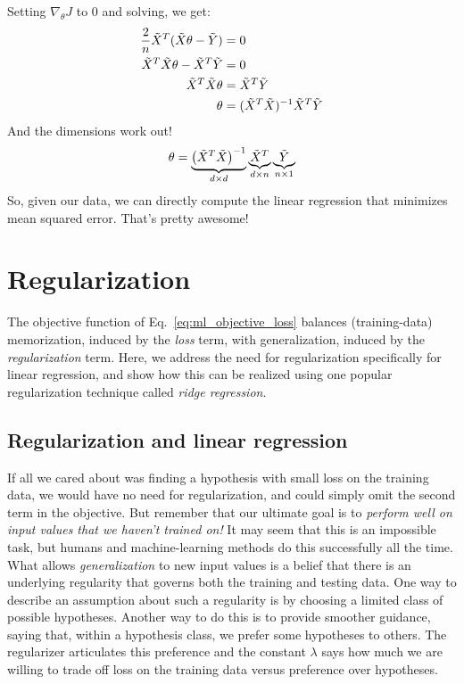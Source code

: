 Setting $ \nabla_{\theta}J$ to 0 and solving, we get:
\begin{align*}
  \frac{2}{n}\tilde{X}^T(\tilde{X}\theta - \tilde{Y}) & = 0                          \\
  \tilde{X}^T\tilde{X}\theta - \tilde{X}^T \tilde{Y}        & = 0                          \\
  \tilde{X}^T\tilde{X}\theta                    & =  \tilde{X}^T \tilde{Y}                 \\
  \theta                            & =  (\tilde{X}^T\tilde{X})^{-1} \tilde{X}^T \tilde{Y} \\
\end{align*}
And the dimensions work out!
$$ \theta = \underbrace{\left(\tilde{X}^T\tilde{X}\right)^{-1}}_{d \times d}\underbrace{\tilde{X}^T}_{d \times n}\underbrace{\tilde{Y}}_{n \times 1} $$
So, given our data, we can directly compute the linear regression that
minimizes mean squared error.  That's pretty awesome!

\section{Regularization}

\label{sec-regularization}

The objective function of Eq.~\ref{eq:ml_objective_loss} balances
(training-data) memorization, induced by the {\em loss} term, with generalization,
induced by the {\em regularization} term.  Here, we address the need
for regularization specifically for linear regression, and show how
this can be realized using one popular regularization technique called {\em ridge regression}.

\subsection{Regularization and linear regression}

If all we cared about was finding a hypothesis with small loss on the
training data, we would have no need for regularization, and could
simply omit the second term in the objective.  But remember that our
ultimate goal is to {\em perform well on input values that we haven't
    trained on!}  It may seem that this is an impossible task, but
humans and machine-learning methods do this successfully all the
time.  What allows {\em generalization} to new input values is a
belief that there is an underlying regularity that governs both the
training and testing data.  One way to
describe an assumption about such a regularity is by choosing a
limited class of possible hypotheses.  Another way to do this is to
provide smoother guidance, saying that, within a hypothesis class, we
prefer some hypotheses to others.  The regularizer articulates this
preference and the constant $\lambda$ says how much we are willing to
trade off loss on the training data versus preference over hypotheses.

